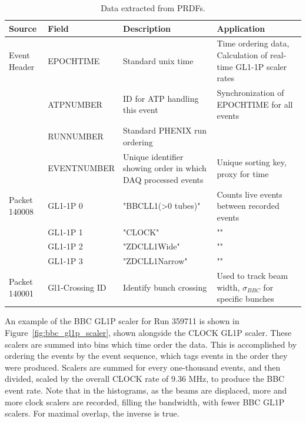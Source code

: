 \begin{table}
\centering
\begin{tabular}{ l l p{6cm} p{8cm} }
\toprule
\textbf{Source} & \textbf{Field} & \textbf{Description} & \textbf{Application} \\
\midrule 
Event Header & EPOCHTIME & Standard unix time & Time ordering data, Calculation of real-time GL1-1P scaler rates \\
 & ATPNUMBER & ID for ATP handling this event & Synchronization of EPOCHTIME for all events \\
 & RUNNUMBER & Standard PHENIX run ordering & \\
 & EVENTNUMBER & Unique identifier showing order in which DAQ processed events & Unique sorting key, proxy for time \\
Packet 140008 & GL1-1P 0 & "BBCLL1(\textgreater0 tubes)" & Counts live events between recorded events \\
 & GL1-1P 1 & "CLOCK" & "" \\
 & GL1-1P 2 & "ZDCLL1Wide" & "" \\
 & GL1-1P 3 & "ZDCLL1Narrow" & "" \\
Packet 140001 & Gl1-Crossing ID & Identify bunch crossing  & Used to track beam width, $\sigma_{BBC}$  for specific bunches\\
\bottomrule
\end{tabular}
\caption{ Data extracted from PRDFs. }
\label{tab:prdf_data_summary}
\end{table}

An example of the BBC GL1P scaler for Run 359711 is shown in
Figure~\ref{fig:bbc_gl1p_scaler}, shown alongside the CLOCK GL1P scaler. These
scalers are summed into bins which time order the data. This is accomplished by
ordering the events by the event sequence, which tags events in the order they
were produced. Scalers are summed for every one-thousand events, and then
divided, scaled by the overall CLOCK rate of 9.36 MHz, to produce the BBC event
rate. Note that in the histograms, as the beams are displaced, more and more
clock scalers are recorded, filling the bandwidth, with fewer BBC GL1P scalers.
For maximal overlap, the inverse is true.

